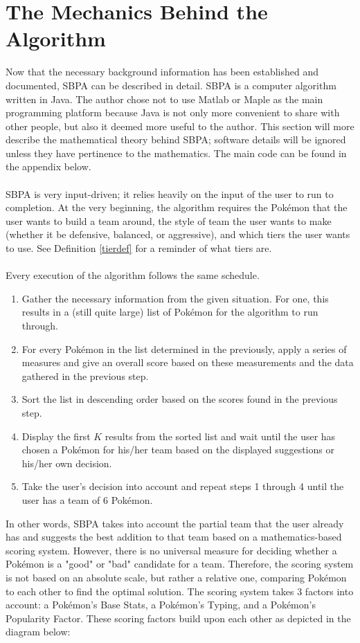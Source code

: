 \documentclass{article}
\begin{document}
\section{The Mechanics Behind the Algorithm}
Now that the necessary background information has been established and documented, SBPA can be described in detail. SBPA is a computer algorithm written in Java. The author chose not to use Matlab or Maple as the main programming platform because Java is not only more convenient to share with other people, but also it deemed more useful to the author. This section will more describe the mathematical theory behind SBPA; software details will be ignored unless they have pertinence to the mathematics. The main code can be found in the appendix below.\\\\
SBPA is very input-driven; it relies heavily on the input of the user to run to completion. At the very beginning, the algorithm requires the Pok\'emon that the user wants to build a team around, the style of team the user wants to make (whether it be defensive, balanced, or aggressive), and which tiers the user wants to use. See Definition \ref{tierdef} for a reminder of what tiers are.\\\\
Every execution of the algorithm follows the same schedule.
\begin{enumerate}
	\item Gather the necessary information from the given situation. For one, this results in a (still quite large) list of Pok\'emon for the algorithm to run through.
	\item For every Pok\'emon in the list determined in the previously, apply a series of measures and give an overall score based on these measurements and the data gathered in the previous step.
	\item Sort the list in descending order based on the scores found in the previous step.
	\item Display the first $K$ results from the sorted list and wait until the user has chosen a Pok\'emon for his/her team based on the displayed suggestions or his/her own decision.
	\item Take the user's decision into account and repeat steps 1 through 4 until the user has a team of 6 Pok\'emon.
\end{enumerate}
In other words, SBPA takes into account the partial team that the user already has and suggests the best addition to that team based on a mathematics-based scoring system. However, there is no universal measure for deciding whether a Pok\'emon is a "good" or "bad" candidate for a team. Therefore, the scoring system is not based on an absolute scale, but rather a relative one, comparing Pok\'emon to each other to find the optimal solution. The scoring system takes 3 factors into account: a Pok\'emon's Base Stats, a Pok\'emon's Typing, and a Pok\'emon's Popularity Factor. These scoring factors build upon each other as depicted in the diagram below:
\end{document}
